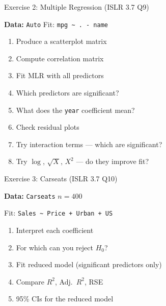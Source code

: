 \documentclass[aspectratio=169, 11pt]{beamer}
\begin{document}
\begin{frame}{Exercise 2: Multiple Regression (ISLR 3.7 Q9)}

\textbf{Data:} \texttt{Auto} \hfill Fit: \texttt{mpg \textasciitilde{} . - name}

\vspace{0.5em}
\begin{enumerate}
  \item Produce a scatterplot matrix
  \item Compute correlation matrix
  \item Fit MLR with all predictors
  \item Which predictors are significant?
  \item What does the \texttt{year} coefficient mean?
  \item Check residual plots
  \item Try interaction terms --- which are significant?
  \item Try $\log$, $\sqrt{X}$, $X^2$ --- do they improve fit?
\end{enumerate}
\end{frame}


\begin{frame}{Exercise 3: Carseats (ISLR 3.7 Q10)}

\textbf{Data:} \texttt{Carseats} \hfill $n = 400$

\vspace{0.5em}
Fit: \texttt{Sales \textasciitilde{} Price + Urban + US}
\begin{enumerate}
  \item Interpret each coefficient
  \item For which can you reject $H_0$?
  \item Fit reduced model (significant predictors only)
  \item Compare $R^2$, Adj.\ $R^2$, RSE
  \item 95\% CIs for the reduced model
\end{enumerate}

\vspace{0.5em}
\end{frame}
\end{document}
